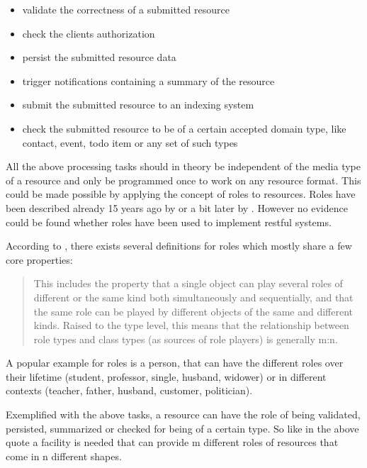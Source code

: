 \documentclass[12pt,a4paper,twoside]{scrartcl}		%
\begin{document}
\begin{itemize}
\item validate the correctness of a submitted resource
\item check the clients authorization
\item persist the submitted resource data
\item trigger notifications containing a summary of the resource
\item submit the submitted resource to an indexing system
\item check the submitted resource to be of a certain accepted domain type, like
  contact, event, todo item or any set of such types
\end{itemize}

All the above processing tasks should in theory be independent of the media type
of a resource and only be programmed once to work on any resource format. This
could be made possible by applying the concept of roles to resources. Roles have
been described already 15 years ago by \cite{Fowler1997} or a bit later by
\cite{Baeumer2000}. However no evidence could be found whether roles have been
used to implement restful systems.

According to \cite{Steimann2008}, there exists several definitions for roles
which mostly share a few core properties:

\begin{quote}
  This includes the property that a single object can play several roles of
  different or the same kind both simultaneously and sequentially, and that the
  same role can be played by different objects of the same and different
  kinds. Raised to the type level, this means that the relationship between role
  types and class types (as sources of role players) is generally m:n.
\end{quote}

A popular example for roles is a person, that can have the different roles over
their lifetime (student, professor, single, husband, widower) or in different
contexts (teacher, father, husband, customer, politician).


Exemplified with the above tasks, a resource can have the role of being
validated, persisted, summarized or checked for being of a certain type. So like
in the above quote a facility is needed that can provide m different roles of
resources that come in n different shapes.
\end{document}
